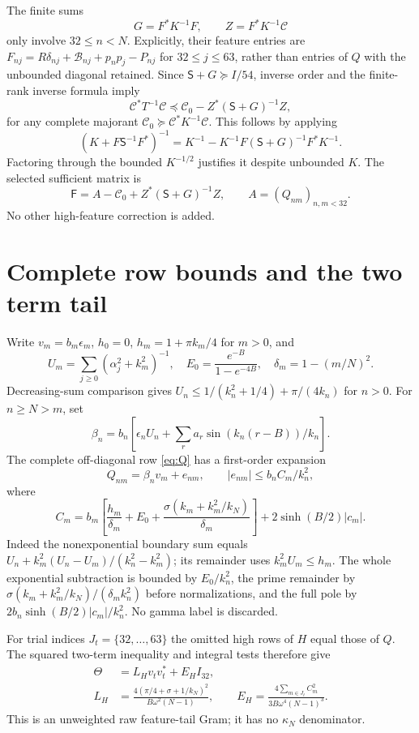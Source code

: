 \documentclass[11pt]{article}
\begin{document}
The finite sums
\[
 G=F^*K^{-1}F,\qquad Z=F^*K^{-1}\mathcal C
\]
only involve $32\le n<N$. Explicitly, their feature entries are $F_{nj}=R\delta_{nj}+\mathcal B_{nj}+p_np_j-P_{nj}$ for $32\le j\le63$, rather than entries of $Q$ with the unbounded diagonal retained. Since $\mathsf S+G\succeq I/54$, inverse order and the finite-rank inverse formula imply
\begin{equation}
 \mathcal C^*T^{-1}\mathcal C
 \preceq\mathcal C_0-Z^*(\mathsf S+G)^{-1}Z,\label{eq:woodbury}
\end{equation}
for any complete majorant $\mathcal C_0\succeq\mathcal C^*K^{-1}\mathcal C$. This follows by applying
\[
 (K+F\mathsf S^{-1}F^*)^{-1}
 =K^{-1}-K^{-1}F(\mathsf S+G)^{-1}F^*K^{-1}.
\]
Factoring through the bounded $K^{-1/2}$ justifies it despite unbounded $K$. The selected sufficient matrix is
\begin{equation}
 \mathsf F=A-\mathcal C_0+Z^*(\mathsf S+G)^{-1}Z,
 \qquad A=(Q_{nm})_{n,m<32}.\label{eq:finite}
\end{equation}
No other high-feature correction is added.

\section{Complete row bounds and the two term tail}\label{sec:tail}
Write $v_m=b_m\epsilon_m$, $h_0=0$, $h_m=1+\pi k_m/4$ for $m>0$, and
\[
 U_m=\sum_{j\ge0}(\alpha_j^2+k_m^2)^{-1},\quad
 E_0=\frac{e^{-B}}{1-e^{-4B}},\quad \delta_m=1-(m/N)^2.
\]
Decreasing-sum comparison gives $U_n\le1/(k_n^2+1/4)+\pi/(4k_n)$ for $n>0$. For $n\ge N>m$, set
\[
 \beta_n=b_n\left[\epsilon_nU_n+
 \sum_ra_r\sin(k_n(r-B))/k_n\right].
\]
The complete off-diagonal row \eqref{eq:Q} has a first-order expansion
\[
 Q_{nm}=\beta_nv_m+e_{nm},\qquad |e_{nm}|\le b_n C_m/k_n^2,
\]
where
\begin{equation}
 C_m=b_m\left[\frac{h_m}{\delta_m}+E_0
 +\frac{\sigma(k_m+k_m^2/k_N)}{\delta_m}\right]
 +2\sinh(B/2)|c_m|.\label{eq:Cm}
\end{equation}
Indeed the nonexponential boundary sum equals
$U_n+k_m^2(U_n-U_m)/(k_n^2-k_m^2)$; its remainder uses $k_m^2U_m\le h_m$. The whole exponential subtraction is bounded by $E_0/k_n^2$, the prime remainder by $\sigma(k_m+k_m^2/k_N)/(\delta_mk_n^2)$ before normalizations, and the full pole by $2b_n\sinh(B/2)|c_m|/k_n^2$. No gamma label is discarded.

For trial indices $J_t=\{32,\ldots,63\}$ the omitted high rows of $H$ equal those of $Q$. The squared two-term inequality and integral tests therefore give
\begin{align}
 \Theta&=L_Hv_tv_t^*+E_HI_{32},\label{eq:Theta}\\
 L_H&=\frac{4(\pi/4+\sigma+1/k_N)^2}{B\omega^2(N-1)},\qquad
 E_H=\frac{4\sum_{m\in J_t}C_m^2}{3B\omega^4(N-1)^3}.\nonumber
\end{align}
This is an unweighted raw feature-tail Gram; it has no $\kappa_N$ denominator.
\end{document}
